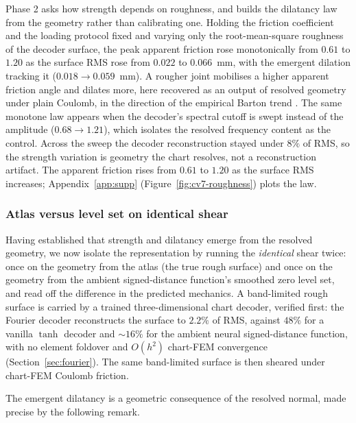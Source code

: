 \documentclass{svjour3}                 %
\begin{document}
Phase 2 asks how strength depends on roughness, and builds the dilatancy law from the geometry rather than calibrating one. Holding the friction coefficient and the loading protocol fixed and varying only the root-mean-square roughness of the decoder surface, the peak apparent friction rose monotonically from $0.61$ to $1.20$ as the surface RMS rose from $0.022$ to $0.066$~mm, with the emergent dilation tracking it ($0.018\to0.059$~mm). A rougher joint mobilises a higher apparent friction angle and dilates more, here recovered as an output of resolved geometry under plain Coulomb, in the direction of the empirical Barton trend \citep{barton1977shear,barton1990review}. The same monotone law appears when the decoder's spectral cutoff is swept instead of the amplitude ($0.68\to1.21$), which isolates the resolved frequency content as the control. Across the sweep the decoder reconstruction stayed under $8\%$ of RMS, so the strength variation is geometry the chart resolves, not a reconstruction artifact. The apparent friction rises from $0.61$ to $1.20$ as the surface RMS increases; Appendix~\ref{app:supp} (Figure~\ref{fig:cv7-roughness}) plots the law.

\subsubsection{Atlas versus level set on identical shear}\label{sec:cv7-payoff}

Having established that strength and dilatancy emerge from the resolved geometry, we now isolate the representation by running the \emph{identical} shear twice: once on the geometry from the atlas (the true rough surface) and once on the geometry from the ambient signed-distance function's smoothed zero level set, and read off the difference in the predicted mechanics. A band-limited rough surface is carried by a trained three-dimensional chart decoder, verified first: the Fourier decoder reconstructs the surface to $2.2\%$ of RMS, against $48\%$ for a vanilla $\tanh$ decoder and $\sim16\%$ for the ambient neural signed-distance function, with no element foldover and $O(h^2)$ chart-FEM convergence (Section~\ref{sec:fourier}). The same band-limited surface is then sheared under chart-FEM Coulomb friction.

The emergent dilatancy is a geometric consequence of the resolved normal, made precise by the following
remark.
\end{document}
